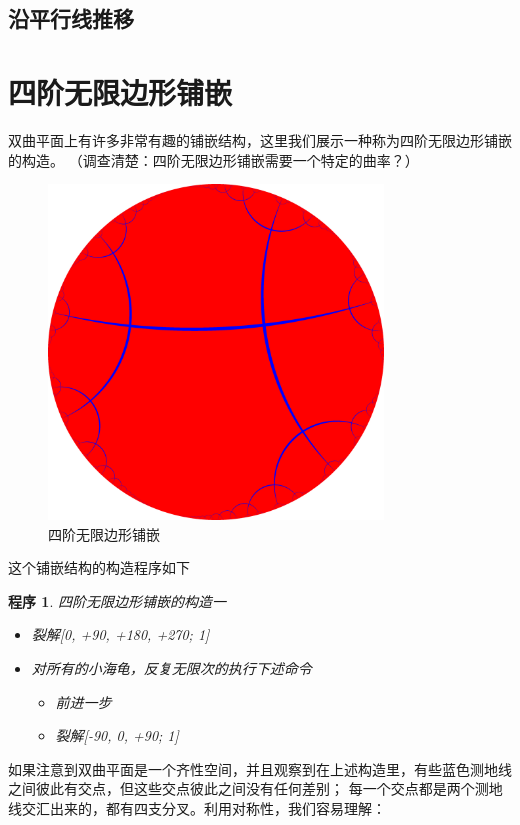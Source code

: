 \documentclass[a4paper,12pt]{article}
\newtheorem{program}{程序}
\begin{document}
\subsection{沿平行线推移}

\newpage

\section{四阶无限边形铺嵌}

双曲平面上有许多非常有趣的铺嵌结构，这里我们展示一种称为四阶无限边形铺嵌的构造。
（调查清楚：四阶无限边形铺嵌需要一个特定的曲率？）

\begin{figure}[ht]
\centering
\includegraphics[width=3.5in]{images/H2_tiling_24i-1.png}
\caption{四阶无限边形铺嵌}
\end{figure}

这个铺嵌结构的构造程序如下

\begin{program}
四阶无限边形铺嵌的构造一
\begin{itemize}
\item 裂解[0, +90, +180, +270; 1]
\item 对所有的小海龟，反复无限次的执行下述命令
\begin{itemize}\item 前进一步 \item 裂解[-90, 0, +90; 1] \end{itemize}
\end{itemize}
\end{program}

如果注意到双曲平面是一个齐性空间，并且观察到在上述构造里，有些蓝色测地线之间彼此有交点，但这些交点彼此之间没有任何差别；
每一个交点都是两个测地线交汇出来的，都有四支分叉。利用对称性，我们容易理解：
\end{document}
